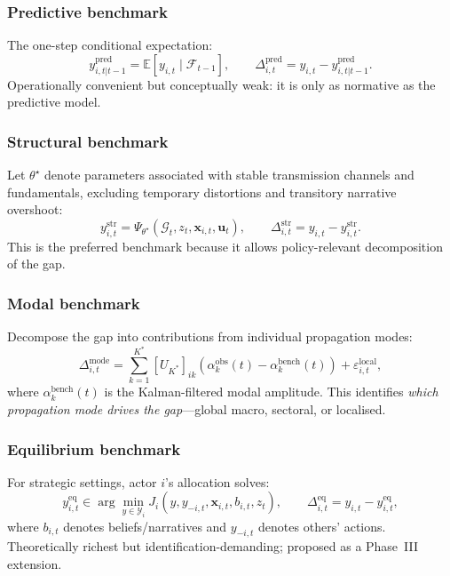 \documentclass[11pt,a4paper]{article}
\theoremstyle{definition}
\newcommand{\E}{\mathbb{E}}
\newcommand{\bx}{\bm{x}}
\newcommand{\bu}{\bm{u}}
\begin{document}
\subsubsection{Predictive benchmark}
The one-step conditional expectation:
\begin{equation}
  y^{\mathrm{pred}}_{i,t|t-1} = \E[y_{i,t} \mid \mathcal{F}_{t-1}], \qquad \Delta^{\mathrm{pred}}_{i,t} = y_{i,t} - y^{\mathrm{pred}}_{i,t|t-1}.
  \label{eq:pred_bench}
\end{equation}
Operationally convenient but conceptually weak: it is only as normative as the predictive model.

\subsubsection{Structural benchmark}
Let $\theta^\star$ denote parameters associated with stable transmission channels and fundamentals, excluding temporary distortions and transitory narrative overshoot:
\begin{equation}
  y^{\mathrm{str}}_{i,t} = \Psi_{\theta^\star}(\mathcal{G}_t, z_t, \bx_{i,t}, \bu_t), \qquad \Delta^{\mathrm{str}}_{i,t} = y_{i,t} - y^{\mathrm{str}}_{i,t}.
  \label{eq:str_bench}
\end{equation}
This is the preferred benchmark because it allows policy-relevant decomposition of the gap.

\subsubsection{Modal benchmark}
Decompose the gap into contributions from individual propagation modes:
\begin{equation}
  \Delta^{\mathrm{mode}}_{i,t} = \sum_{k=1}^{K^*} [U_{K^*}]_{ik}\!\left(\alpha_k^{\mathrm{obs}}(t) - \alpha_k^{\mathrm{bench}}(t)\right) + \varepsilon_{i,t}^{\mathrm{local}},
  \label{eq:mode_bench}
\end{equation}
where $\alpha_k^{\mathrm{bench}}(t)$ is the Kalman-filtered modal amplitude. This identifies \emph{which propagation mode drives the gap}---global macro, sectoral, or localised.

\subsubsection{Equilibrium benchmark}
For strategic settings, actor $i$'s allocation solves:
\begin{equation}
  y^{\mathrm{eq}}_{i,t} \in \arg\min_{y \in \mathcal{Y}_i} J_i(y, y_{-i,t}, \bx_{i,t}, b_{i,t}, z_t), \qquad \Delta^{\mathrm{eq}}_{i,t} = y_{i,t} - y^{\mathrm{eq}}_{i,t},
  \label{eq:eq_bench}
\end{equation}
where $b_{i,t}$ denotes beliefs/narratives and $y_{-i,t}$ denotes others' actions. Theoretically richest but identification-demanding; proposed as a Phase~III extension.
\end{document}
